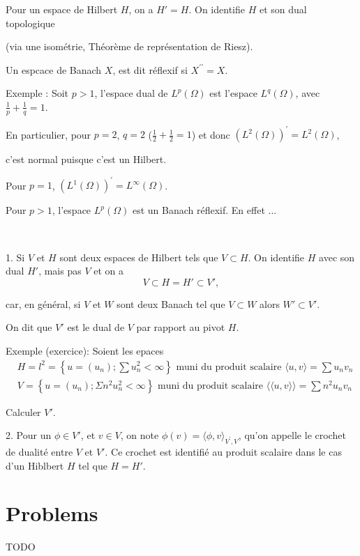 Pour un espace de Hilbert $H$, on a $H'=H$. On identifie $H$ et son dual topologique 

(via une isométrie, Théorème de représentation de  Riesz). 

Un espcace de Banach $X$, est dit réflexif si $X^{\prime\prime}=X$.  

Exemple :  Soit $p>1$, l'espace dual de $L^p(\Omega)$ est  l'espace $L^q(\Omega)$, avec $\frac1p+\frac1q=1$.  

En particulier, pour $p=2$, $q=2$ ($\frac12+\frac12=1$) et  donc $(L^2(\Omega))^\prime=L^2(\Omega)$, 

c'est normal puisque c'est un Hilbert.

Pour $p=1$,  $(L^1(\Omega))^\prime=L^\infty(\Omega)$. 

Pour $p>1$, l'espace $L^p(\Omega)$ est un Banach réflexif.   En effet ...

\begin{remark}\
	
1. Si $V$ et $H$ sont deux espaces de Hilbert tels que $V\subset H$.   On identifie $H$ avec son dual $H'$, mais pas $V$ et on a 
$$
	V\subset H=H'\subset V',
	$$
	
	car, en général,  si $V$ et $W$  sont deux Banach tel que $V\subset W$ alors $W'\subset V'$.  
	
	On dit que $V'$ est le dual de $V$ par rapport au pivot $H$.


Exemple (exercice):	 Soient les epaces 
$$
\begin{aligned}
	&H=l^{2}=\left\{u=\left(u_{n}\right) ; \sum u_{n}^{2}<\infty\right\}  \text { muni du produit scalaire }\langle u, v\rangle=\sum u_{n} v_{n} \\
	&V=\left\{u=\left(u_{n}\right) ; \Sigma n^{2} u_{n}^{2}<\infty\right\} \text { muni du produit scalaire }\langle \langle u, v\rangle\rangle=\sum n^{2} u_{n} v_{n}
\end{aligned}
$$

Calculer $V'$. 


2.  Pour un $\phi\in V'$,   et $v\in V$, on note $\phi(v)=\langle \phi, v\rangle_{V^{\prime}, V}$, qu'on appelle  le crochet de dualité entre $V$ et $V'$. Ce crochet est identifié au produit scalaire dans le cas d'un Hiblbert $H$  tel que $H=H'$.

\end{remark} 

\section{Problems}

\begin{exercise}
  TODO
\end{exercise}

